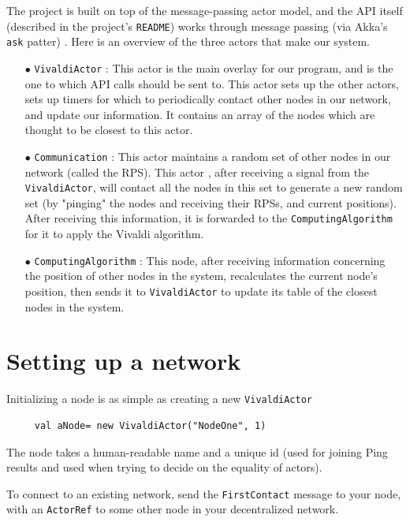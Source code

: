 \documentclass[11pt,a4paper]{article}
\begin{document}
The project is built on top of the message-passing actor model, and the API itself (described in the project's \verb|README|) works through message passing (via Akka's \verb|ask| patter) . Here is an overview of the three actors that make our system. 
\begin{itemize}
	\item[$\bullet$] \verb|VivaldiActor| : This actor is the main overlay for our program, and is the one to which API calls should be sent to. This actor sets up the other actors, sets up timers for which to periodically contact other nodes in our network, and update our information. It contains an array of the nodes which are thought to be closest to this actor.
	
	\item[$\bullet$] \verb|Communication| : 
	   This actor maintains a random set of other nodes in our network (called the RPS). This actor , after receiving a signal from the \verb|VivaldiActor|, will contact all the nodes in this set to generate a new random set (by "pinging" the nodes and receiving their RPSs, and current positions). After receiving this information, it is forwarded to the \verb|ComputingAlgorithm| for it to apply the Vivaldi algorithm.
		
	\item[$\bullet$] \verb|ComputingAlgorithm| : This node, after receiving information concerning the position of other nodes in the system, recalculates the current node's position, then sends it to \verb|VivaldiActor| to update its table of the closest nodes in the system.
\end{itemize}


\section{Setting up a network}

 Initializing a node is as simple as creating a new \verb|VivaldiActor|
 \begin{verbatim}
 	 val aNode= new VivaldiActor("NodeOne", 1)
 \end{verbatim}
 
 The node takes a human-readable name and a unique id (used for joining Ping results and used when trying to decide on the equality of actors). 
 
 To connect to an existing network, send the \verb|FirstContact| message to your node, with an \verb|ActorRef| to some other node in your decentralized network.
 
\end{document}
